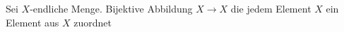 \documentclass[class=article, crop=false]{standalone}
\begin{document}
\begin{flashcard}
    Sei $X$-endliche Menge. Bijektive Abbildung $X \to  X$ die jedem Element $X$ ein Element aus $X$ zuordnet

\end{flashcard}
\end{document}
